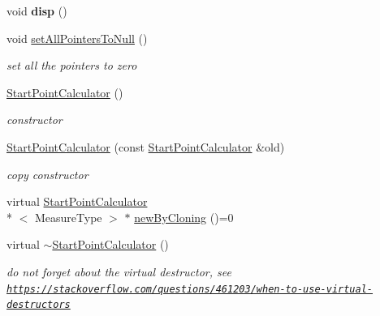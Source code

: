 \begin{DoxyCompactItemize}
\item 
\hypertarget{class_ox_1_1_start_point_calculator_a1e68d3a23cee006d4dbdd47583c5d316}{void {\bfseries disp} ()}\label{class_ox_1_1_start_point_calculator_a1e68d3a23cee006d4dbdd47583c5d316}

\item 
\hypertarget{class_ox_1_1_start_point_calculator_a00a48e8845623b57e414380924a3f82b}{void \hyperlink{class_ox_1_1_start_point_calculator_a00a48e8845623b57e414380924a3f82b}{set\-All\-Pointers\-To\-Null} ()}\label{class_ox_1_1_start_point_calculator_a00a48e8845623b57e414380924a3f82b}

\begin{DoxyCompactList}\small\item\em set all the pointers to zero \end{DoxyCompactList}\item 
\hypertarget{class_ox_1_1_start_point_calculator_a408ce85b6fbf0ee69f4eca3176b814d6}{\hyperlink{class_ox_1_1_start_point_calculator_a408ce85b6fbf0ee69f4eca3176b814d6}{Start\-Point\-Calculator} ()}\label{class_ox_1_1_start_point_calculator_a408ce85b6fbf0ee69f4eca3176b814d6}

\begin{DoxyCompactList}\small\item\em constructor \end{DoxyCompactList}\item 
\hypertarget{class_ox_1_1_start_point_calculator_ab6b12ed8fa6b47b3335b5c7a92b94623}{\hyperlink{class_ox_1_1_start_point_calculator_ab6b12ed8fa6b47b3335b5c7a92b94623}{Start\-Point\-Calculator} (const \hyperlink{class_ox_1_1_start_point_calculator}{Start\-Point\-Calculator} \&old)}\label{class_ox_1_1_start_point_calculator_ab6b12ed8fa6b47b3335b5c7a92b94623}

\begin{DoxyCompactList}\small\item\em copy constructor \end{DoxyCompactList}\item 
virtual \hyperlink{class_ox_1_1_start_point_calculator}{Start\-Point\-Calculator}\\*
$<$ Measure\-Type $>$ $\ast$ \hyperlink{class_ox_1_1_start_point_calculator_acd2a221872002157f232e1e7f73a1859}{new\-By\-Cloning} ()=0
\item 
\hypertarget{class_ox_1_1_start_point_calculator_a210c3312a8926b750dba8e498c6b620a}{virtual \hyperlink{class_ox_1_1_start_point_calculator_a210c3312a8926b750dba8e498c6b620a}{$\sim$\-Start\-Point\-Calculator} ()}\label{class_ox_1_1_start_point_calculator_a210c3312a8926b750dba8e498c6b620a}

\begin{DoxyCompactList}\small\item\em do not forget about the virtual destructor, see \href{https://stackoverflow.com/questions/461203/when-to-use-virtual-destructors}{\tt https\-://stackoverflow.\-com/questions/461203/when-\/to-\/use-\/virtual-\/destructors} \end{DoxyCompactList}\end{DoxyCompactItemize}
